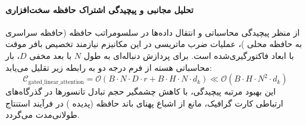 \paragraph{تحلیل مجانبی و پیچیدگی اشتراک حافظه سخت‌افزاری}
از منظر پیچیدگی محاسباتی و انتقال داده‌ها در سلسومراتب حافظه (حافظه سراسری  به حافظه محلی )، عملیات ضرب ماتریسی در این مکانیزم نیازمند تخصیص بافر موقت با ابعاد فاکتورگیری‌شده است. برای پردازش دنباله‌ای به طول $N$ با بعد مخفی $D$، بار محاسباتی هسته از فرم درجه دو به رابطه زیر تقلیل می‌یابد:
\begin{equation}
\label{eq:complexity_gated_linear_attention}
\mathcal{C}_{\text{gated\_linear\_attention}} = \mathcal{O}\left( B \cdot N \cdot D \cdot r + B \cdot H \cdot N \cdot d_k \right) \ll \mathcal{O}\left( B \cdot H \cdot N^2 \cdot d_k \right)
\end{equation}
این بهبود مرتبه پیچیدگی، با کاهش چشمگیر حجم تبادل تانسورها در گذرگاه‌های ارتباطی کارت گرافیک، مانع از اشباع پهنای باند حافظه (پدیده ) در فرآیند استنتاج طولانی‌مدت می‌گردد.
